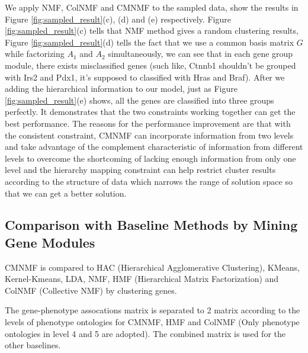 \documentclass{bmcart}
\begin{document}
We apply NMF, ColNMF and CMNMF to the sampled data, show the results in Figure \ref{fig:sampled_result}(c), (d) and (e) respectively. Figure \ref{fig:sampled_result}(c) tells that NMF method gives a random clustering results, Figure \ref{fig:sampled_result}(d) tells the fact that we use a common basis matrix $G$ while factorizing $A_1$ and $A_2$ simultaneously, we can see that in each gene group module, there exists misclassified genes (such like, Ctnnb1 shouldn't be grouped with Irs2 and Pdx1, it's supposed to classified with Hras and Braf). After we adding the hierarchical information to our model, just as Figure \ref{fig:sampled_result}(e) shows, all the genes are classified into three groups perfectly. It demonstrates that the two constraints working together can get the best performance. The reasons for the performance improvement are that with the consistent constraint, CMNMF can incorporate information from two levels and take advantage of the complement characteristic of information from different levels to overcome the shortcoming of lacking enough information from only one level and the hierarchy mapping constraint can help restrict cluster results according to the structure of data which narrows the range of solution space so that we can get a better solution.

\subsection*{\textbf{Comparison with Baseline Methods by Mining Gene Modules}}

CMNMF is compared to HAC (Hierarchical Agglomerative Clustering)\cite{Ward1963}, KMeans, Kernel-Kmeans\cite{Dhillon2004}, LDA\cite{Blei2003}, NMF\cite{Mika1999}, HMF (Hierarchical Matrix Factorization) \cite{AliMashhoori2012} and ColNMF (Collective NMF)\cite{Singh2008} by clustering genes.

The gene-phenotype assocations matrix is separated to 2 matrix according to the levels of phenotype ontologies for CMNMF, HMF and ColNMF (Only phenotype ontologies in level 4 and 5 are adopted). The combined matrix is used for the other baselines.
\end{document}

